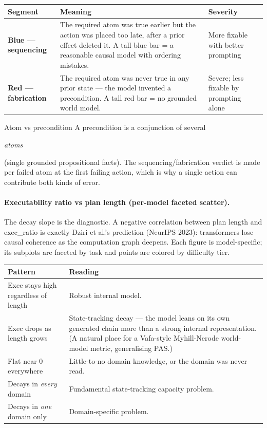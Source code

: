 \begin{table}[h]\small
\centering
\begin{tabularx}{\linewidth}{@{}l Y l@{}}
\toprule
Segment & Meaning & Severity\\
\midrule
\textbf{Blue --- sequencing} & The required atom was true earlier but the action was placed too late, after a prior effect deleted it. A tall blue bar = a reasonable causal model with ordering mistakes. & More fixable with better prompting\\
\addlinespace
\textbf{Red --- fabrication} & The required atom was never true in any prior state --- the model invented a precondition. A tall red bar = no grounded world model. & Severe; less fixable by prompting alone\\
\bottomrule
\end{tabularx}
\end{table}

\begin{bmkeybox}{Atom vs precondition}
A precondition is a conjunction of several

\emph{atoms}

(single grounded propositional facts). The sequencing/fabrication verdict is made per failed atom at the first failing action, which is why a single action can contribute both kinds of error.
\end{bmkeybox}

\paragraph{Executability ratio vs plan length (per-model faceted scatter).}

The decay slope is the diagnostic. A negative correlation between plan length and exec\_ratio is exactly Dziri et al.'s prediction (NeurIPS 2023): transformers lose causal coherence as the computation graph deepens. Each figure is model-specific; its subplots are faceted by task and points are colored by difficulty tier.

\begin{table}[h]\small
\centering
\begin{tabularx}{\linewidth}{@{}l Y@{}}
\toprule
Pattern & Reading\\
\midrule
Exec stays high regardless of length & Robust internal model.\\
\addlinespace
Exec drops as length grows & State-tracking decay --- the model leans on its own generated chain more than a strong internal representation. (A natural place for a Vafa-style Myhill-Nerode world-model metric, generalising PAS.)\\
\addlinespace
Flat near 0 everywhere & Little-to-no domain knowledge, or the domain was never read.\\
\addlinespace
Decays in \emph{every} domain & Fundamental state-tracking capacity problem.\\
\addlinespace
Decays in \emph{one} domain only & Domain-specific problem.\\
\bottomrule
\end{tabularx}
\end{table}

